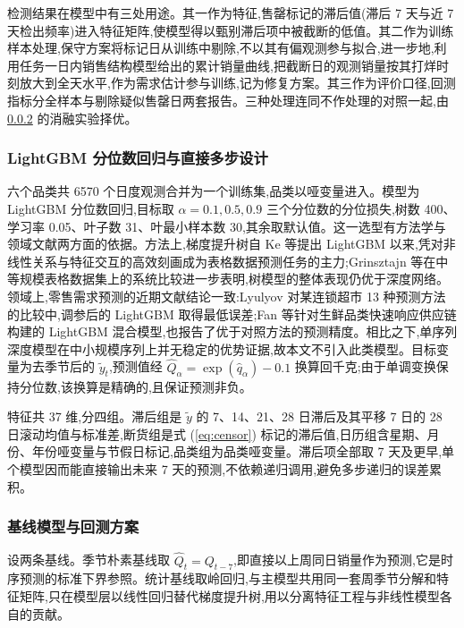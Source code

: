 检测结果在模型中有三处用途。其一作为特征,售罄标记的滞后值(滞后 7 天与近 7 天检出频率)进入特征矩阵,使模型得以甄别滞后项中被截断的低值。其二作为训练样本处理,保守方案将标记日从训练中剔除,不以其有偏观测参与拟合,进一步地,利用任务一日内销售结构模型给出的累计销量曲线,把截断日的观测销量按其打烊时刻放大到全天水平,作为需求估计参与训练,记为修复方案。其三作为评价口径,回测指标分全样本与剔除疑似售罄日两套报告。三种处理连同不作处理的对照一起,由 \ref{subsec:bt} 的消融实验择优。

\subsubsection{LightGBM 分位数回归与直接多步设计}

六个品类共 6570 个日度观测合并为一个训练集,品类以哑变量进入。模型为 LightGBM 分位数回归,目标取 $\alpha=0.1,0.5,0.9$ 三个分位数的分位损失,树数 400、学习率 0.05、叶子数 31、叶最小样本数 30,其余取默认值。这一选型有方法学与领域文献两方面的依据。方法上,梯度提升树自 Ke 等提出 LightGBM 以来\cite{ke2017},凭对非线性关系与特征交互的高效刻画成为表格数据预测任务的主力;Grinsztajn 等在中等规模表格数据集上的系统比较进一步表明,树模型的整体表现仍优于深度网络\cite{grinsztajn2022}。领域上,零售需求预测的近期文献结论一致:Lyulyov 对某连锁超市 13 种预测方法的比较中,调参后的 LightGBM 取得最低误差\cite{lyulyov2024};Fan 等针对生鲜品类快速响应供应链构建的 LightGBM 混合模型,也报告了优于对照方法的预测精度\cite{fan2024}。相比之下,单序列深度模型在中小规模序列上并无稳定的优势证据,故本文不引入此类模型。目标变量为去季节后的 $\tilde{y}_t$,预测值经 $\hat{Q}_\alpha=\exp(\hat{q}_\alpha)-0.1$ 换算回千克;由于单调变换保持分位数,该换算是精确的,且保证预测非负。

特征共 37 维,分四组。滞后组是 $\tilde{y}$ 的 7、14、21、28 日滞后及其平移 7 日的 28 日滚动均值与标准差,断货组是式 (\ref{eq:censor}) 标记的滞后值,日历组含星期、月份、年份哑变量与节假日标记,品类组为品类哑变量。滞后项全部取 7 天及更早,单个模型因而能直接输出未来 7 天的预测,不依赖递归调用,避免多步递归的误差累积。

\subsubsection{基线模型与回测方案}
\label{subsec:bt}

设两条基线。季节朴素基线取 $\hat{Q}_t = Q_{t-7}$,即直接以上周同日销量作为预测,它是时序预测的标准下界参照。统计基线取岭回归,与主模型共用同一套周季节分解和特征矩阵,只在模型层以线性回归替代梯度提升树,用以分离特征工程与非线性模型各自的贡献。

